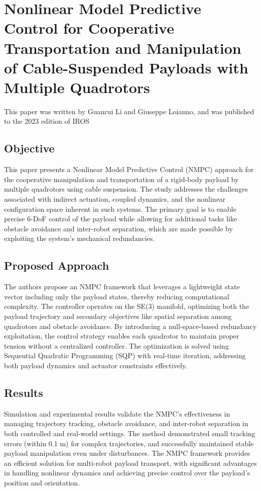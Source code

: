 \documentclass[a4paper,12pt]{article}
\begin{document}
\section{Nonlinear Model Predictive Control for Cooperative Transportation and Manipulation of Cable-Suspended Payloads with Multiple Quadrotors}

This paper\cite{li2023nonlinear} was written by Guanrui Li and Giuseppe Loianno, and was published to the 2023 edition of IROS

\subsection{Objective}
This paper presents a Nonlinear Model Predictive Control (NMPC) approach for the cooperative manipulation and transportation of a rigid-body payload by multiple quadrotors using cable suspension. The study addresses the challenges associated with indirect actuation, coupled dynamics, and the nonlinear configuration space inherent in such systems. The primary goal is to enable precise 6-DoF control of the payload while allowing for additional tasks like obstacle avoidance and inter-robot separation, which are made possible by exploiting the system’s mechanical redundancies.

\subsection{Proposed Approach}
The authors propose an NMPC framework that leverages a lightweight state vector including only the payload states, thereby reducing computational complexity. The controller operates on the SE(3) manifold, optimizing both the payload trajectory and secondary objectives like spatial separation among quadrotors and obstacle avoidance. By introducing a null-space-based redundancy exploitation, the control strategy enables each quadrotor to maintain proper tension without a centralized controller. The optimization is solved using Sequential Quadratic Programming (SQP) with real-time iteration, addressing both payload dynamics and actuator constraints effectively.

\subsection{Results}
Simulation and experimental results validate the NMPC’s effectiveness in managing trajectory tracking, obstacle avoidance, and inter-robot separation in both controlled and real-world settings. The method demonstrated small tracking errors (within 0.1 m) for complex trajectories, and successfully maintained stable payload manipulation even under disturbances. The NMPC framework provides an efficient solution for multi-robot payload transport, with significant advantages in handling nonlinear dynamics and achieving precise control over the payload’s position and orientation.
\end{document}
